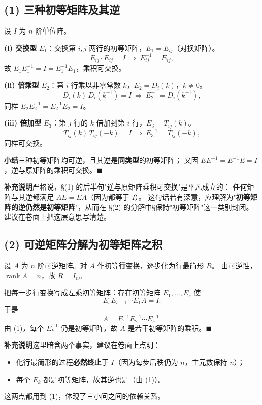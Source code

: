 \documentclass[10pt]{ctexart}
\newcommand{\rank}{\operatorname{rank}}
\begin{document}
\subsection*{(1) 三种初等矩阵及其逆}

设 $I$ 为 $n$ 阶单位阵。

\textbf{(i) 交换型} $E_1$：交换第 $i,j$ 两行的初等矩阵，$E_1=E_{ij}$（对换矩阵）。
\[
E_{ij}\cdot E_{ij}=I\ \Longrightarrow\ E_{ij}^{-1}=E_{ij},
\]
故 $E_1 E_1^{-1}=I=E_1^{-1}E_1$，乘积可交换。

\textbf{(ii) 倍乘型} $E_2$：第 $i$ 行乘以非零常数 $k$，$E_2=D_i(k)$，$k\neq0$。
\[
D_i(k)\,D_i(k^{-1})=I\ \Longrightarrow\ E_2^{-1}=D_i(k^{-1}),
\]
同样 $E_2E_2^{-1}=E_2^{-1}E_2=I$。

\textbf{(iii) 倍加型} $E_3$：第 $j$ 行的 $k$ 倍加到第 $i$ 行，$E_3=T_{ij}(k)$。
\[
T_{ij}(k)\,T_{ij}(-k)=I\ \Longrightarrow\ E_3^{-1}=T_{ij}(-k),
\]
同样可交换。

\textbf{小结}\quad 三种初等矩阵均可逆，且其逆是\textbf{同类型}的初等矩阵；
又因 $E E^{-1}=E^{-1}E=I$，逆与原矩阵的乘积可交换。$\blacksquare$

\begin{supbox}
\textbf{补充说明}\quad 严格说，\S(1) 的后半句"逆与原矩阵乘积可交换"是平凡成立的：
任何矩阵与其逆都满足 $AE=EA$（因为都等于 $I$）。
这句话若有深意，应理解为"\textbf{初等矩阵的逆仍然是初等矩阵}"，从而在
\S(2) 的分解中\S 保持"初等矩阵"这一类别封闭。建议在卷面上把这层意思写清楚。
\end{supbox}

\subsection*{(2) 可逆矩阵分解为初等矩阵之积}

设 $A$ 为 $n$ 阶可逆矩阵。对 $A$ 作初等\textbf{行}变换，逐步化为行最简形 $R$。
由可逆性，$\rank A=n$，故 $R=I_n$。

把每一步行变换写成左乘初等矩阵：存在初等矩阵 $E_1,\dots,E_s$ 使
\[
E_sE_{s-1}\cdots E_1 A=I .
\]
于是
\[
A=E_1^{-1}E_2^{-1}\cdots E_s^{-1}.
\]
由 (1)，每个 $E_k^{-1}$ 仍是初等矩阵，故 $A$ 是若干初等矩阵的乘积。$\blacksquare$

\begin{supbox}
\textbf{补充说明}\quad 这里暗含两个事实，建议在卷面上点明：
\begin{itemize}
\item 化行最简形的过程\textbf{必然终止}于 $I$（因为每步后秩仍为 $n$，主元数保持 $n$）；
\item 每个 $E_k$ 都是初等矩阵，故其逆也是（由 (1)）。
\end{itemize}
这两点都用到 (1)，体现了三小问之间的依赖关系。
\end{supbox}
\end{document}
